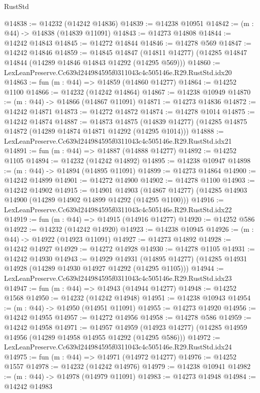 \begin{lexlean}{RustStd}
\begin{coremodule}
@14838 := @14232 (@14242 @14836)
@14839 := @14238 @10951
@14842 := (m : @44) -> @14838 (@14839 @11091)
@14843 := @14273 @14808
@14844 := @14242 @14843
@14845 := @14272 @14844
@14846 := @14278 @569
@14847 := @14242 @14846
@14859 := @14845
    @14847
    (@14811 @14277)
    (@14285 @14847 @14844 (@14289 @14846 @14843 @14292 (@14295 @569)))
@14860 := LexLeanPreserve.Cc639d244984595f0311043c4c505146e.R29.RustStd.idx20
@14863 := fun (m : @44) => @14859 (@14860 @14277)
@14864 := @14252 @1100
@14866 := @14232 (@14242 @14864)
@14867 := @14238 @10949
@14870 := (m : @44) -> @14866 (@14867 @11091)
@14871 := @14273 @14836
@14872 := @14242 @14871
@14873 := @14272 @14872
@14874 := @14278 @1014
@14875 := @14242 @14874
@14887 := @14873
    @14875
    (@14839 @14277)
    (@14285 @14875 @14872 (@14289 @14874 @14871 @14292 (@14295 @1014)))
@14888 := LexLeanPreserve.Cc639d244984595f0311043c4c505146e.R29.RustStd.idx21
@14891 := fun (m : @44) => @14887 (@14888 @14277)
@14892 := @14252 @1105
@14894 := @14232 (@14242 @14892)
@14895 := @14238 @10947
@14898 := (m : @44) -> @14894 (@14895 @11091)
@14899 := @14273 @14864
@14900 := @14242 @14899
@14901 := @14272 @14900
@14902 := @14278 @1100
@14903 := @14242 @14902
@14915 := @14901
    @14903
    (@14867 @14277)
    (@14285 @14903 @14900 (@14289 @14902 @14899 @14292 (@14295 @1100)))
@14916 := LexLeanPreserve.Cc639d244984595f0311043c4c505146e.R29.RustStd.idx22
@14919 := fun (m : @44) => @14915 (@14916 @14277)
@14920 := @14252 @586
@14922 := @14232 (@14242 @14920)
@14923 := @14238 @10945
@14926 := (m : @44) -> @14922 (@14923 @11091)
@14927 := @14273 @14892
@14928 := @14242 @14927
@14929 := @14272 @14928
@14930 := @14278 @1105
@14931 := @14242 @14930
@14943 := @14929
    @14931
    (@14895 @14277)
    (@14285 @14931 @14928 (@14289 @14930 @14927 @14292 (@14295 @1105)))
@14944 := LexLeanPreserve.Cc639d244984595f0311043c4c505146e.R29.RustStd.idx23
@14947 := fun (m : @44) => @14943 (@14944 @14277)
@14948 := @14252 @1568
@14950 := @14232 (@14242 @14948)
@14951 := @14238 @10943
@14954 := (m : @44) -> @14950 (@14951 @11091)
@14955 := @14273 @14920
@14956 := @14242 @14955
@14957 := @14272 @14956
@14958 := @14278 @586
@14959 := @14242 @14958
@14971 := @14957
    @14959
    (@14923 @14277)
    (@14285 @14959 @14956 (@14289 @14958 @14955 @14292 (@14295 @586)))
@14972 := LexLeanPreserve.Cc639d244984595f0311043c4c505146e.R29.RustStd.idx24
@14975 := fun (m : @44) => @14971 (@14972 @14277)
@14976 := @14252 @1557
@14978 := @14232 (@14242 @14976)
@14979 := @14238 @10941
@14982 := (m : @44) -> @14978 (@14979 @11091)
@14983 := @14273 @14948
@14984 := @14242 @14983

\end{coremodule}
\end{lexlean}
